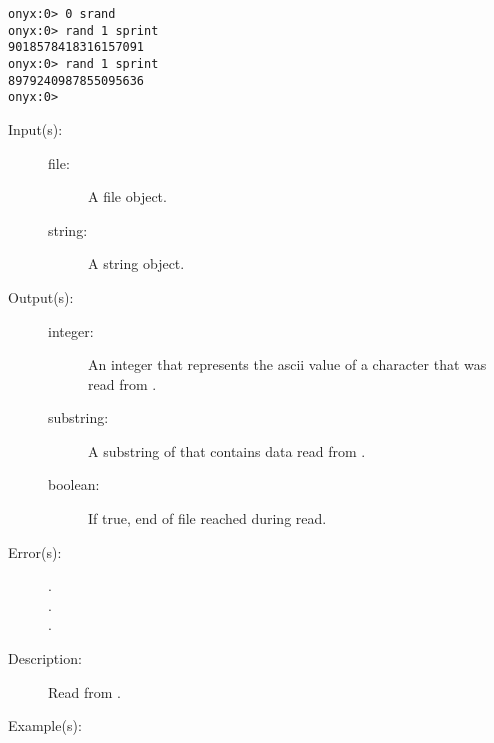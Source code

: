 \begin{description}
\begin{description}
\begin{verbatim}
onyx:0> 0 srand
onyx:0> rand 1 sprint
9018578418316157091
onyx:0> rand 1 sprint
8979240987855095636
onyx:0>
		\end{verbatim}
	\end{description}
\label{systemdict:read}
\item[{\onyxop{file}{read}{integer boolean}}: ]
\item[{\onyxop{file string}{read}{substring boolean}}: ]
	\begin{description}\item[]
	\item[Input(s): ]
		\begin{description}\item[]
		\item[file: ]
			A file object.
		\item[string: ]
			A string object.
		\end{description}
	\item[Output(s): ]
		\begin{description}\item[]
		\item[integer: ]
			An integer that represents the ascii value of a
			character that was read from .
		\item[substring: ]
			A substring of  that contains data
			read from .
		\item[boolean: ]
			If true, end of file reached during read.
		\end{description}
	\item[Error(s): ]
		\begin{description}\item[]
		\item[.]
		\item[.]
		\item[.]
		\end{description}
	\item[Description: ]
		Read from .
	\item[Example(s): ]\begin{verbatim}


\end{verbatim}
\end{description}
\end{description}
